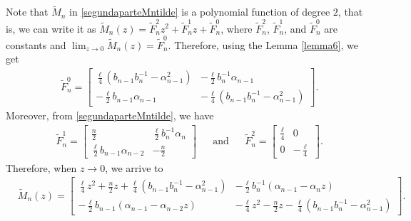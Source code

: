 \documentclass[12pt]{amsart}
\begin{document}
Note that \( \widetilde{M}_n \) in \eqref{segundaparteMntilde} is a polynomial function of degree \( 2 \), that is, we can write it as \( \widetilde{M}_n(z)=\widetilde{F}_n^2 z^2+\widetilde{F}_n^{1}z+\widetilde {F}_n^{0} \), where \( \widetilde{F}_n^{2} \), \( \widetilde{F}_n^{1} \), and \( \widetilde{F}_n^0 \) are constants and
\(\displaystyle
\lim_{z \to 0}\widetilde{M}_n(z)=\widetilde{F}_n^{0} \).
Therefore, using the 
Lemma \ref{lemma6}, we get
\begin{align*}
& \widetilde{F}_n^{0}={\begin{bmatrix}
\frac{ \ell }{4} ( b_{n-1}b_n^{-1}-\alpha_{n-1}^2 ) & -\frac{ \ell }{2}b_n^{-1}\alpha_{n-1}\\
 -\frac{ \ell }{2}b_{n-1}\alpha_{n-1} & -\frac{ \ell }{4} ( b_{n-1}b_n^{-1}-\alpha_{n-1}^2)
\end{bmatrix}}.
\end{align*}
Moreover, from \eqref{segundaparteMntilde}, we have
\begin{align*}
& \widetilde{F}_n^{1}={\begin{bmatrix}
\frac{n}{2} & \frac{ \ell }{2}b_{n}^{-1}\alpha_n \\
\frac{ \ell }{2}b_{n-1}\alpha_{n-2} & -\frac{n}{2}
\end{bmatrix}} &&
\mbox{and}
&& \widetilde{F}_n^{2}={\begin{bmatrix}
\frac{ \ell }{4} & 0 \\
0 & -\frac{ \ell }{4}
\end{bmatrix}}.
\end{align*}
Therefore, when \( z\to 0 \), we arrive 
to
\begin{align}\label{matriztilde}
& \widetilde{M}_n(z)=
\begin{bmatrix}
\frac{ \ell }{4}z^2+\frac{n}{2}z+\frac{ \ell }{4} ( b_{n-1}b_n^{-1}-\alpha_{n-1}^2) & -\frac{ \ell }{2}b_n^{-1}(\alpha_{n-1}-\alpha_n z) \\ 
-\frac{ \ell }{2}b_{n-1}(\alpha_{n-1}-\alpha_{n-2}z) & -\frac{ \ell }{4}z^2-\frac{n}{2}z-\frac{ \ell }{4} ( b_{n-1}b_n^{-1}-\alpha_{n-1}^2 )
\end{bmatrix} .
\end{align}
\end{document}
